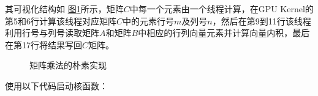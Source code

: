 \documentclass[letterpaper,10pt,english]{sphinxmanual}
\let\sphinxpxdimen\pdfpxdimen\else\newdimen\sphinxpxdimen
\begin{document}
\begin{sphinxVerbatim}[commandchars=\\\{\}]
\PYG{p}{[}\PYG{p}{]}
\PYG{p}{[}\PYG{p}{]}
\end{sphinxVerbatim}

\sphinxAtStartPar
其可视化结构如
\hyperref[\detokenize{chapter_accelerator/accelerator_practise:cuda-naive-gemm}]{图\ref{\detokenize{chapter_accelerator/accelerator_practise:cuda-naive-gemm}}}所示，矩阵\(C\)中每一个元素由一个线程计算，在GPU
Kernel的第5和6行计算该线程对应矩阵\(C\)中的元素行号\(m\)及列号\(n\)，然后在第9到11行该线程利用行号与列号读取矩阵\(A\)和矩阵\(B\)中相应的行列向量元素并计算向量内积，最后在第17行将结果写回\(C\)矩阵。

\begin{figure}[H]
\centering
\capstart

\noindent\sphinxincludegraphics[width=800\sphinxpxdimen]{{naive}.svg}
\caption{矩阵乘法的朴素实现}\label{\detokenize{chapter_accelerator/accelerator_practise:id24}}\label{\detokenize{chapter_accelerator/accelerator_practise:cuda-naive-gemm}}\end{figure}

\sphinxAtStartPar
使用以下代码启动核函数：
\end{document}
